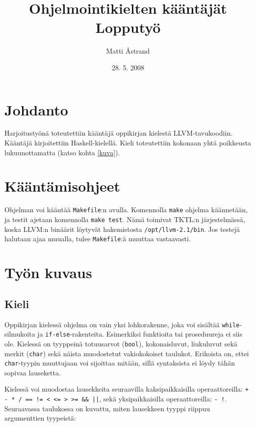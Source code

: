 \documentclass[12pt]{article}
\title{Ohjelmointikielten kääntäjät \\ Lopputyö}
\author{Matti Åstrand}
\date{28. 5. 2008}
\newcommand{\code}{\texttt}
\begin{document}
\maketitle

\section{Johdanto}
Harjoitustyönä toteutettiin kääntäjä oppikirjan \cite{dragon} kielestä LLVM-tavukoodiin. 
Kääntäjä kirjoitettiin Haskell-kielellä.
Kieli toteutettiin kokonaan yhtä poikkeusta lukuunottamatta 
 (katso kohta \ref{kuva}).

\section{Kääntämisohjeet}
Ohjelman voi kääntää \code{Makefile}:n avulla. Komennolla \code{make} ohjelma 
käännetään, ja testit ajetaan komennolla \code{make test}. Nämä toimivat TKTL:n 
järjestelmässä, koska LLVM:n binäärit löytyvät hakemistosta \code{/opt/llvm-2.1/bin}. 
Jos testejä halutaan ajaa muualla, tulee \code{Makefile}:ä muuttaa vastaavasti.

\section{Työn kuvaus}
\subsection{Kieli}
Oppikirjan kielessä ohjelma on vain yksi lohkorakenne, joka voi sisältää 
\code{while}-silmukoita ja \code{if-else}-rakenteita. Esimerkiksi funktioita 
tai proseduureja ei siis ole. Kielessä on tyyppeinä totuusarvot (\code{bool}), 
kokonaisluvut, liukuluvut sekä merkit (\code{char}) sekä näista muodostetut 
vakiokokoiset taulukot. Erikoista on, ettei \code{char}-tyypin muuttujaan 
voi sijoittaa mitään, sillä syntaksista ei löydy tähän sopivaa lauseketta.

Kielessä voi muodostaa lausekkeita seuraavilla kaksipaikkaisilla 
operaattoreilla: 
\code{+ - * / == != < <= > >= \&\& ||}, sekä yksipaikkaisilla operaattoreilla: 
\code{- !}. Seuraavassa taulukossa on kuvattu, miten lausekkeen tyyppi 
riippuu argumenttien tyypeistä:
\end{document}
